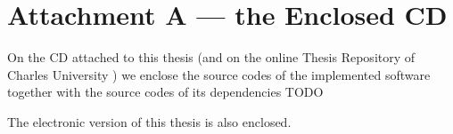 \documentclass[12pt,a4paper,twoside,openright]{report}
\let\openright=\cleardoublepage
\begin{document}



\tableofcontents















\section*{Attachment A --- the Enclosed CD}

On the CD attached to this thesis (and on the online Thesis Repository of Charles University \cite{TRepo}) we enclose
the source codes of the implemented software together with the source codes of its dependencies TODO

The electronic version of this thesis is also enclosed.

\openright
\end{document}
